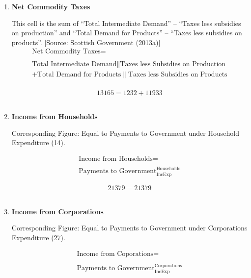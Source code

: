\begin{enumerate}
\item \textbf {Net Commodity Taxes}

This cell is the sum of “Total Intermediate Demand” – “Taxes less subsidies on production” and “Total Demand for Products” – “Taxes less subsidies on products”. [Source: Scottish Government (2013a)]\\

\begin{equation}
\begin{split}
\text{Net Commodity Taxes} =  \\ \\
\text{Total Intermediate Demand}\|\text{Taxes less Subsidies on Production}\\
+\text{Total Demand for Products}\|\text{Taxes less Subsidies on Products}\\
\end{split} \label{eq:2.5.36}
\end{equation}

\begin{equation} \nonumber
13165 = 1232+11933
\end{equation}\\


\item \textbf {Income from Households}

Corresponding Figure: Equal to Payments to Government under Household Expenditure (14).

\begin{equation}
\begin{split}
\text{Income from Households} =  \\ \\
\text{Payments to Government}^\text{Households}_\text{IncExp}
\end{split} \label{eq:2.5.37}
\end{equation}

\begin{equation} \nonumber
21379 = 21379
\end{equation}\\


\item \textbf {Income from Corporations}

Corresponding Figure: Equal to Payments to Government under Corporations Expenditure (27).

\begin{equation}
\begin{split}
\text{Income from Coporations} =  \\ \\
\text{Payments to Government}^\text{Corporations}_\text{IncExp}
\end{split} \label{eq:2.5.38}
\end{equation}


\end{enumerate}
